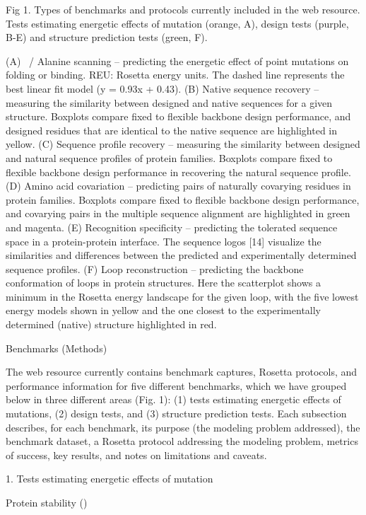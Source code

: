 Fig 1. Types of benchmarks and protocols currently included in the web resource. Tests estimating energetic effects of mutation (orange, A), design tests (purple, B-E) and structure prediction tests (green, F).

(A) \ddg\ / Alanine scanning – predicting the energetic effect of point mutations on folding or binding. REU: Rosetta energy units. The dashed line represents the best linear fit model (y = 0.93x + 0.43). (B) Native sequence recovery – measuring the similarity between designed and native sequences for a given structure. Boxplots compare fixed to flexible backbone design performance, and designed residues that are identical to the native sequence are highlighted in yellow. (C) Sequence profile recovery – measuring the similarity between designed and natural sequence profiles of protein families. Boxplots compare fixed to flexible backbone design performance in recovering the natural sequence profile. (D) Amino acid covariation – predicting pairs of naturally covarying residues in protein families. Boxplots compare fixed to flexible backbone design performance, and covarying pairs in the multiple sequence alignment are highlighted in green and magenta. (E) Recognition specificity – predicting the tolerated sequence space in a protein-protein interface. The sequence logos [14] visualize the similarities and differences between the predicted and experimentally determined sequence profiles. (F) Loop reconstruction – predicting the backbone conformation of loops in protein structures. Here the scatterplot shows a minimum in the Rosetta energy landscape for the given loop, with the five lowest energy models shown in yellow and the one closest to the experimentally determined (native) structure highlighted in red.


Benchmarks (Methods)

The web resource currently contains benchmark captures, Rosetta protocols, and performance information for five different benchmarks, which we have grouped below in three different areas (Fig. 1): (1) tests estimating energetic effects of mutations, (2) design tests, and (3) structure prediction tests. Each subsection describes, for each benchmark, its purpose (the modeling problem addressed), the benchmark dataset, a Rosetta protocol addressing the modeling problem, metrics of success, key results, and notes on limitations and caveats.

1. Tests estimating energetic effects of mutation

Protein stability (\ddg)

